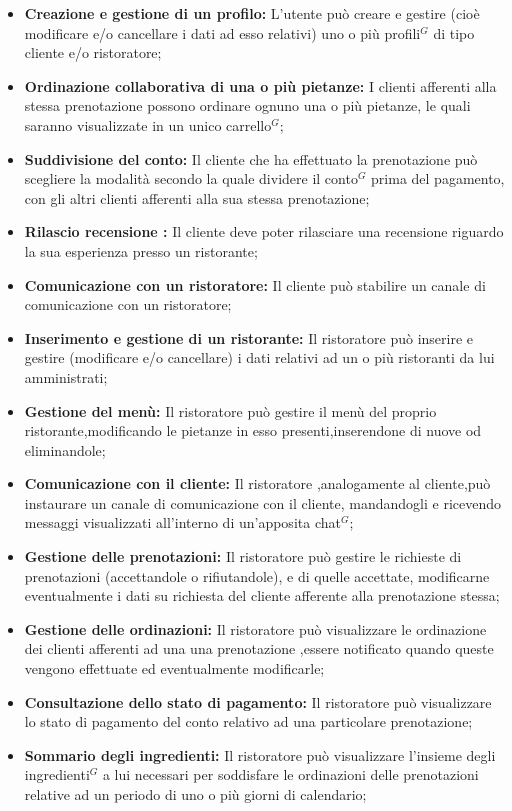\begin{itemize}
    \item \textbf{Creazione e gestione di un profilo:} L'utente può creare e gestire (cioè modificare e/o
    cancellare i dati ad esso relativi) uno o più profili$^{G}$ di tipo cliente e/o ristoratore;
    \item \textbf{Ordinazione collaborativa di una o più pietanze:} I clienti afferenti alla stessa prenotazione
    possono ordinare ognuno una o più pietanze, le quali saranno visualizzate in un unico carrello$^{G}$;
    \item \textbf{Suddivisione del conto:} Il cliente che ha effettuato la prenotazione può scegliere la modalità secondo la quale
    dividere il conto$^{G}$ prima del pagamento, con gli altri clienti afferenti alla sua stessa prenotazione;
    \item \textbf{Rilascio recensione :} Il cliente deve poter rilasciare una recensione riguardo la sua
    esperienza presso un ristorante;
    \item \textbf{Comunicazione con un ristoratore:} Il cliente può stabilire un canale di comunicazione con un
    ristoratore;
    \item \textbf{Inserimento e gestione di un ristorante:} Il ristoratore può inserire e gestire (modificare e/o cancellare)
    i dati relativi ad un o più ristoranti da lui amministrati;
    \item \textbf{Gestione del menù:} Il ristoratore può gestire il menù del proprio ristorante,modificando le pietanze in esso
    presenti,inserendone di nuove od eliminandole;
    \item \textbf{Comunicazione con il cliente:} Il ristoratore ,analogamente al cliente,può instaurare un canale di comunicazione
    con il cliente, mandandogli e ricevendo messaggi visualizzati all'interno di un'apposita chat$^{G}$;
    \item \textbf{Gestione delle prenotazioni:} Il ristoratore può gestire le richieste di prenotazioni (accettandole o rifiutandole), e
    di quelle accettate, modificarne eventualmente i dati su richiesta del cliente afferente alla prenotazione stessa;
    \item \textbf{Gestione delle ordinazioni:} Il ristoratore può visualizzare le ordinazione dei clienti afferenti ad una
    una prenotazione ,essere notificato quando queste vengono effettuate ed eventualmente modificarle;
    \item \textbf{Consultazione dello stato di pagamento:} Il ristoratore può visualizzare lo stato di pagamento del conto relativo ad una
    particolare prenotazione;
    \item \textbf{Sommario degli ingredienti:} Il ristoratore può visualizzare l'insieme degli ingredienti$^{G}$ a lui necessari per soddisfare
    le ordinazioni delle prenotazioni  relative ad un periodo di uno o più giorni di calendario;
\end{itemize}

